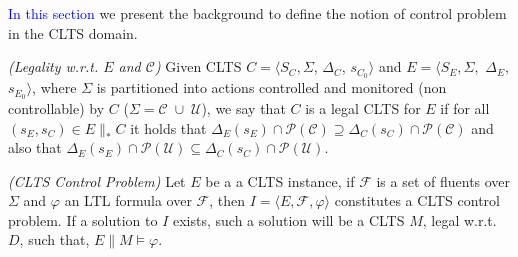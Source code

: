 \textcolor{blue}{In this section} we present the background to define the notion of control problem in the CLTS domain.  

\begin{definition}
	\label{def:legal_clts} \emph{(Legality w.r.t. $E$ and $\mathcal{C}$)} 
	Given CLTS $C = \langle S_C, \Sigma$, $\Delta_C$, $s_{C_0}\rangle$ and $E = \langle S_E,\Sigma,$ $\Delta_E,$ $s_{E_0}\rangle$, where $\Sigma$ is partitioned into actions controlled and monitored (non controllable) by $C$ ($\Sigma=\mathcal{C} \; \cup \;\mathcal{U}$), we say that $C$ is a legal CLTS for $E$ if for all $(s_E,s_C) \in E \parallel_* C$ it holds that
	$\Delta_{E}(s_E)\cap \mathcal{P}(\mathcal{C}) \supseteq \Delta_{C}(s_C)\cap \mathcal{P}(\mathcal{C})$ and also that  $\Delta_{E}(s_E)\cap \mathcal{P}(\mathcal{U}) \subseteq \Delta_{C}(s_C)\cap \mathcal{P}(\mathcal{U})$.
\end{definition}

\begin{definition}
	\label{def:mixed_control_problem} \emph{(CLTS Control Problem)} 
	Let $E$ be a a CLTS instance, if $\mathcal{F}$ is a set of fluents over $\Sigma$ and $\varphi$ an LTL formula over $\mathcal{F}$, then $I = \langle E, \mathcal{F}, \varphi \rangle$ constitutes a CLTS control problem. If a solution to $I$ exists, such a solution will be a CLTS $M$, legal w.r.t. $D$, such that, $E \parallel M \models \varphi$.
\end{definition}
